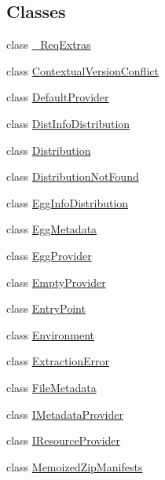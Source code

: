 \subsection*{Classes}
\begin{DoxyCompactItemize}
\item 
class \hyperlink{classpip_1_1__vendor_1_1pkg__resources_1_1__ReqExtras}{\+\_\+\+Req\+Extras}
\item 
class \hyperlink{classpip_1_1__vendor_1_1pkg__resources_1_1ContextualVersionConflict}{Contextual\+Version\+Conflict}
\item 
class \hyperlink{classpip_1_1__vendor_1_1pkg__resources_1_1DefaultProvider}{Default\+Provider}
\item 
class \hyperlink{classpip_1_1__vendor_1_1pkg__resources_1_1DistInfoDistribution}{Dist\+Info\+Distribution}
\item 
class \hyperlink{classpip_1_1__vendor_1_1pkg__resources_1_1Distribution}{Distribution}
\item 
class \hyperlink{classpip_1_1__vendor_1_1pkg__resources_1_1DistributionNotFound}{Distribution\+Not\+Found}
\item 
class \hyperlink{classpip_1_1__vendor_1_1pkg__resources_1_1EggInfoDistribution}{Egg\+Info\+Distribution}
\item 
class \hyperlink{classpip_1_1__vendor_1_1pkg__resources_1_1EggMetadata}{Egg\+Metadata}
\item 
class \hyperlink{classpip_1_1__vendor_1_1pkg__resources_1_1EggProvider}{Egg\+Provider}
\item 
class \hyperlink{classpip_1_1__vendor_1_1pkg__resources_1_1EmptyProvider}{Empty\+Provider}
\item 
class \hyperlink{classpip_1_1__vendor_1_1pkg__resources_1_1EntryPoint}{Entry\+Point}
\item 
class \hyperlink{classpip_1_1__vendor_1_1pkg__resources_1_1Environment}{Environment}
\item 
class \hyperlink{classpip_1_1__vendor_1_1pkg__resources_1_1ExtractionError}{Extraction\+Error}
\item 
class \hyperlink{classpip_1_1__vendor_1_1pkg__resources_1_1FileMetadata}{File\+Metadata}
\item 
class \hyperlink{classpip_1_1__vendor_1_1pkg__resources_1_1IMetadataProvider}{I\+Metadata\+Provider}
\item 
class \hyperlink{classpip_1_1__vendor_1_1pkg__resources_1_1IResourceProvider}{I\+Resource\+Provider}
\item 
class \hyperlink{classpip_1_1__vendor_1_1pkg__resources_1_1MemoizedZipManifests}{Memoized\+Zip\+Manifests}

\end{DoxyCompactItemize}
